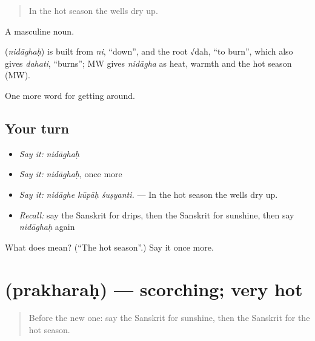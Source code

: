 \begin{quote}
In the hot season the wells dry up.
\end{quote}

A masculine noun.

\begin{cousinweb}
\textbf{} (\emph{nidāghaḥ}) is built from \emph{ni}, \textquotedblleft{}down\textquotedblright{}, and the root √dah, \textquotedblleft{}to burn\textquotedblright{}, which also gives \emph{dahati}, \textquotedblleft{}burns\textquotedblright{}; MW gives \emph{nidāgha} as heat, warmth and the hot season (MW).
\end{cousinweb}

\begin{grammarlens}[title={What you've built}]
One more word for getting around.
\end{grammarlens}

\subsection*{Your turn}
\begin{itemize}
\raggedright
  \item \emph{Say it:} \emph{nidāghaḥ}
  \item \emph{Say it:} \emph{nidāghaḥ}, once more
  \item \emph{Say it:} \emph{nidāghe kūpāḥ śuṣyanti.} — In the hot season the wells dry up.
  \item \emph{Recall:} say the Sanskrit for drips, then the Sanskrit for sunshine, then say \emph{nidāghaḥ} again
\end{itemize}

\begin{tcolorbox}[breakable,colback=teal!4,colframe=teal!35!black,title={Before you move on}]
What does  mean? (\textquotedblleft{}The hot season\textquotedblright{}.) Say it once more.
\end{tcolorbox}
\section[\texorpdfstring{\sk{प्रखरः} (prakharaḥ)}{प्रखरः (prakharaḥ)}]{ (prakharaḥ) — scorching; very hot}

\label{lesson:SA-C438-prakharah}



\begin{quote}
Before the new one: say the Sanskrit for sunshine, then the Sanskrit for the hot season.
\end{quote}

